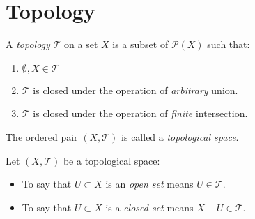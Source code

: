 \documentclass[letterpaper,12pt,fleqn]{article}
\renewcommand{\P}{\mathcal{P}}
\newcommand{\T}{\mathcal{T}}
\begin{document}
\section*{Topology}

\begin{definition}[Topology]
  A \emph{topology} $\T$ on a set $X$ is a subset of $\P(X)$ such that:
  \begin{enumerate}
  \item $\emptyset,X\in\T$
  \item $\T$ is closed under the operation of \emph{arbitrary} union.
  \item $\T$ is closed under the operation of \emph{finite} intersection.
  \end{enumerate}
  The ordered pair $(X,\T)$ is called a \emph{topological space}.
\end{definition}

\begin{definition}[Open]
  Let $(X,\T)$ be a topological space:
  \begin{itemize}
  \item To say that $U\subset X$ is an \emph{open set} means $U\in\T$.
  \item To say that $U\subset X$ is a \emph{closed set} means $X-U\in\T$.
  \end{itemize}
\end{definition}
\end{document}
